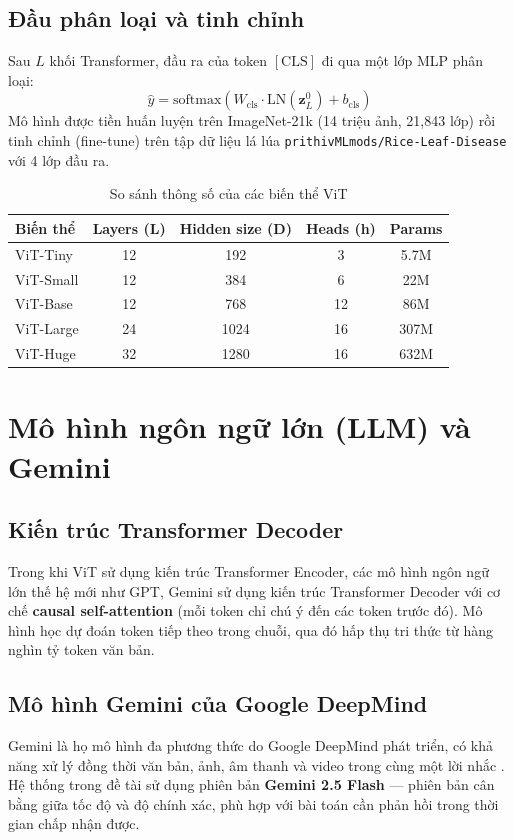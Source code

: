 \documentclass[13pt,a4paper]{extreport}
\begin{document}
\subsection{Đầu phân loại và tinh chỉnh}
Sau $L$ khối Transformer, đầu ra của token $[\text{CLS}]$ đi qua một lớp MLP phân loại:
\begin{equation}
    \hat{y} = \text{softmax}(W_\text{cls} \cdot \text{LN}(\mathbf{z}_L^0) + b_\text{cls})
\end{equation}
Mô hình được tiền huấn luyện trên ImageNet-21k (14 triệu ảnh, 21,843 lớp) rồi tinh chỉnh (fine-tune) trên tập dữ liệu lá lúa \texttt{prithivMLmods/Rice-Leaf-Disease} với 4 lớp đầu ra.

\begin{table}[H]
\centering
\caption{So sánh thông số của các biến thể ViT}
\label{tab:vit_variants}
\begin{tabular}{lcccc}
\toprule
\textbf{Biến thể} & \textbf{Layers (L)} & \textbf{Hidden size (D)} & \textbf{Heads (h)} & \textbf{Params} \\
\midrule
ViT-Tiny  & 12 & 192  & 3  & 5.7M \\
ViT-Small & 12 & 384  & 6  & 22M \\
ViT-Base  & 12 & 768  & 12 & 86M \\
ViT-Large & 24 & 1024 & 16 & 307M \\
ViT-Huge  & 32 & 1280 & 16 & 632M \\
\bottomrule
\end{tabular}
\end{table}

\section{Mô hình ngôn ngữ lớn (LLM) và Gemini}

\subsection{Kiến trúc Transformer Decoder}
Trong khi ViT sử dụng kiến trúc Transformer Encoder, các mô hình ngôn ngữ lớn thế hệ mới như GPT, Gemini sử dụng kiến trúc Transformer Decoder với cơ chế \textbf{causal self-attention} (mỗi token chỉ chú ý đến các token trước đó). Mô hình học dự đoán token tiếp theo trong chuỗi, qua đó hấp thụ tri thức từ hàng nghìn tỷ token văn bản.

\subsection{Mô hình Gemini của Google DeepMind}
Gemini là họ mô hình đa phương thức do Google DeepMind phát triển, có khả năng xử lý đồng thời văn bản, ảnh, âm thanh và video trong cùng một lời nhắc \cite{google2023}. Hệ thống trong đề tài sử dụng phiên bản \textbf{Gemini 2.5 Flash} --- phiên bản cân bằng giữa tốc độ và độ chính xác, phù hợp với bài toán cần phản hồi trong thời gian chấp nhận được.
\end{document}
